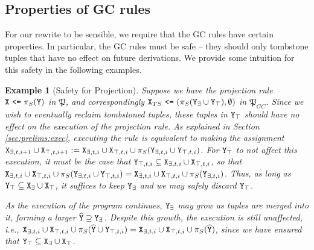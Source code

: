 \documentclass{article}
\numberwithin{equation}{section}
\newtheorem{example}{Example}[section]
\renewcommand{\tt}[1]{\ifmmode\text{\texttt{#1}}\else\texttt{#1}\fi}
\begin{document}
\subsection{Properties of GC rules}
For our rewrite to be sensible, we require that the GC rules have certain properties.
In particular, the GC rules must be safe -- they should only tombstone tuples that have no effect on future derivations.
We provide some intuition for this safety in the following examples.

\begin{example}[Safety for Projection]
Suppose we have the projection rule $\tt{X} ~\tt{<=}~ \pi_S(\tt{Y})$ in $\mathfrak{P}$, and correspondingly $\tt{X}_{TS} ~\tt{<=}~ (\pi_S(\tt{Y}_\exists \cup \tt{Y}_\top), \emptyset)$ in $\mathfrak{P}_{GC}$.
Since we wish to eventually reclaim tombstoned tuples, these tuples in $\tt{Y}_\top$ should have no effect on the execution of the projection rule.
As explained in Section \ref{sec:prelims:exec}, executing the rule is equivalent to making the assignment $\tt{X}_{\exists,t,i+1} \cup \tt{X}_{\top,t,i+1} := \tt{X}_{\exists,t,i} \cup \tt{X}_{\top,t,i} \cup \pi_S(\tt{Y}_{\exists,t,i} \cup \tt{Y}_{\top,t,i})$.
For $\tt{Y}_\top$ to not affect this execution, it must be the case that $\tt{Y}_{\top,t,i} \subseteq \tt{X}_{\exists,t,i} \cup \tt{X}_{\top,t,i}$, so that $\tt{X}_{\exists,t,i} \cup \tt{X}_{\top,t,i} \cup \pi_S(\tt{Y}_{\exists,t,i} \cup \tt{Y}_{\top,t,i}) = \tt{X}_{\exists,t,i} \cup \tt{X}_{\top,t,i} \cup \pi_S(\tt{Y}_{\exists,t,i})$.
Thus, as long as $\tt{Y}_\top \subseteq \tt{X}_\exists \cup \tt{X}_\top$, it suffices to keep $\tt{Y}_\exists$ and we may safely discard $\tt{Y}_\top$.

As the execution of the program continues, $\tt{Y}_\exists$ may grow as tuples are merged into it, forming a larger $\widehat{\tt{Y}} \supseteq \tt{Y}_\exists$.
Despite this growth, the execution is still unaffected, i.e., $\tt{X}_{\exists,t,i} \cup \tt{X}_{\top,t,i} \cup \pi_S(\widehat{\tt{Y}} \cup \tt{Y}_{\top,t,i}) = \tt{X}_{\exists,t,i} \cup \tt{X}_{\top,t,i} \cup \pi_S(\widehat{\tt{Y}})$, since we have ensured that $\tt{Y}_\top \subseteq \tt{X}_\exists \cup \tt{X}_\top$.
\end{example}
\end{document}
